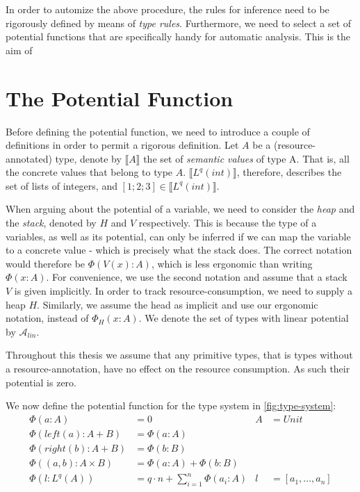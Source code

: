 In order to automize the above procedure, the rules for inference need to be rigorously defined by means of \emph{type rules}. Furthermore, we need to select a set of potential functions that are specifically handy for automatic analysis. This is the aim of 

\section{The Potential Function}
Before defining the potential function, we need to introduce a couple of definitions in order to permit a rigorous definition.
Let \(A\) be a (resource-annotated) type, denote by \(\llbracket A \rrbracket\) the set of \emph{semantic values} of type A. That is, all the concrete values that belong to type \(A\). \(\llbracket L^{q}(int)\rrbracket \), therefore, describes the set of lists of integers, and \([1;2;3] \in \llbracket L^{q}(int)\rrbracket \). 

When arguing about the potential of a variable, we need to consider the \emph{heap} and the \emph{stack}, denoted by \(H\) and \(V\) respectively. This is because the type of a variables, as well as its potential, can only be inferred if we can map the variable to a concrete value - which is precisely what the stack does. The correct notation would therefore be \(\Phi(V(x) : A)\), which is less ergonomic than writing \(\Phi(x : A)\). For convenience, we use the second notation and assume that a stack \(V\) is given implicitly.
In order to track resource-consumption, we need to supply a heap \(H\). Similarly, we assume the head as implicit and use our ergonomic notation, instead of \(\Phi_{H}(x : A)\).  
We denote the set of types with linear potential by \(\mathcal{A}_{lin}\). 

Throughout this thesis we assume that any primitive types, that is types without a resource-annotation, have no effect on the resource consumption. As such their potential is zero. 

We now define the potential function for the type system in \ref{fig:type-system}:
\begin{align*}
   \Phi(a : A) &= 0 ~~~ & A &= Unit \\
   \Phi(left(a): A + B) &= \Phi(a: A) \\
   \Phi(right(b): A + B) &= \Phi(b: B) \\
   \Phi((a, b) : A \times B) &= \Phi(a: A) + \Phi(b: B) \\
   \Phi(l : L^q(A)) &= q \cdot n + \displaystyle\sum_{i = 1}^{n} \Phi(a_i : A) & l &= [a_1, \dots, a_n] \\
\end{align*}

